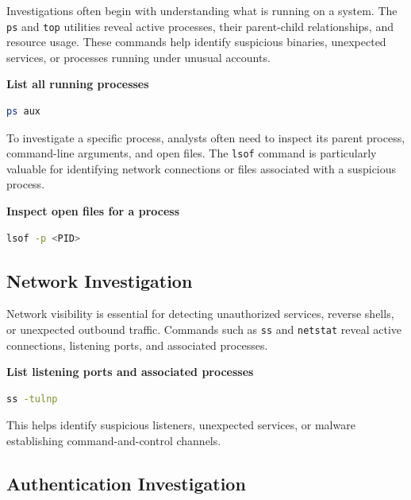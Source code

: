 Investigations often begin with understanding what is running on a system. The \texttt{ps} and \texttt{top} utilities 
reveal active processes, their parent-child relationships, and resource usage. These commands help identify suspicious 
binaries, unexpected services, or processes running under unusual accounts.

\textbf{List all running processes}

\begin{lstlisting}[language=bash]
ps aux
\end{lstlisting}

To investigate a specific process, analysts often need to inspect its parent process, command-line arguments, and open files. 
The \texttt{lsof} command is particularly valuable for identifying network connections or files associated with a suspicious process.

\textbf{Inspect open files for a process}

\begin{lstlisting}[language=bash]
lsof -p <PID>
\end{lstlisting}


\subsection*{Network Investigation}

Network visibility is essential for detecting unauthorized services, reverse shells, or unexpected outbound traffic. 
Commands such as \texttt{ss} and \texttt{netstat} reveal active connections, listening ports, and associated processes.

\textbf{List listening ports and associated processes}

\begin{lstlisting}[language=bash]
ss -tulnp
\end{lstlisting}

This helps identify suspicious listeners, unexpected services, or malware establishing command-and-control channels.


\subsection*{Authentication Investigation}

